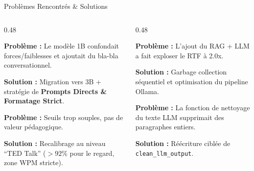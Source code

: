 \documentclass[10pt,aspectratio=169]{beamer}
\begin{document}
\begin{frame}{Problèmes Rencontrés \& Solutions}
    \begin{columns}[T]
        \begin{column}{0.48\textwidth}
            \begin{tcolorbox}[colframe=warning, title=Hallucinations du LLM 1B, colback=warning!3]
                \scriptsize
                \textbf{Problème :} Le modèle 1B confondait forces/faiblesses et ajoutait du bla-bla conversationnel.
                
                \textbf{Solution :} Migration vers 3B + stratégie de \textbf{Prompts Directs \& Formatage Strict}.
            \end{tcolorbox}
            \vspace{0.15cm}
            \begin{tcolorbox}[colframe=danger, title=Scores Irréalistes (99/100), colback=danger!3]
                \scriptsize
                \textbf{Problème :} Seuils trop souples, pas de valeur pédagogique.

                \textbf{Solution :} Recalibrage au niveau ``TED Talk'' ($>92\%$ pour le regard, zone WPM stricte).
            \end{tcolorbox}
        \end{column}
        \begin{column}{0.48\textwidth}
            \begin{tcolorbox}[colframe=danger, title=Régression de Performance, colback=danger!3]
                \scriptsize
                \textbf{Problème :} L'ajout du RAG + LLM a fait exploser le RTF à 2.0x.
                
                \textbf{Solution :} Garbage collection séquentiel et optimisation du pipeline Ollama.
            \end{tcolorbox}
            \vspace{0.15cm}
            \begin{tcolorbox}[colframe=accent, title=Bug Regex Destructeur, colback=accent!3]
                \scriptsize
                \textbf{Problème :} La fonction de nettoyage du texte LLM supprimait des paragraphes entiers.
                
                \textbf{Solution :} Réécriture ciblée de \texttt{clean\_llm\_output}.
            \end{tcolorbox}
        \end{column}
    \end{columns}
\end{frame}
\end{document}
